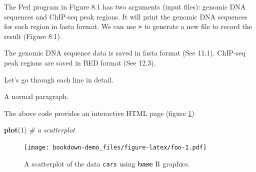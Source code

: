 \documentclass[]{book}
\newenvironment{Shaded}{\begin{snugshade}}{\end{snugshade}}
\newcommand{\KeywordTok}[1]{\textcolor[rgb]{0.13,0.29,0.53}{\textbf{{#1}}}}
\newcommand{\DecValTok}[1]{\textcolor[rgb]{0.00,0.00,0.81}{{#1}}}
\newcommand{\CommentTok}[1]{\textcolor[rgb]{0.56,0.35,0.01}{\textit{{#1}}}}
\newcommand{\NormalTok}[1]{{#1}}
\begin{document}
The Perl program in Figure 8.1 has two arguments (input files): genomic
DNA sequences and ChIP-seq peak regions. It will print the genomic DNA
sequences for each region in fasta format. We can use
\texttt{\textgreater{}} to generate a new file to record the result
(Figure 8.1).

The genomic DNA sequence data is saved in fasta format (See 11.1).
ChIP-seq peak regions are saved in BED format (See 12.3).

Let's go through each line in detail.

A normal paragraph.

The above code provides an interactive HTML page (figure \ref{fig:foo})




\begin{Shaded}
\begin{Highlighting}[]
\KeywordTok{plot}\NormalTok{(}\DecValTok{1}\NormalTok{)  }\CommentTok{# a scatterplot}
\end{Highlighting}
\end{Shaded}

\begin{figure}[htbp]
\centering
\texttt{[image: bookdown-demo\_files/figure-latex/foo-1.pdf]}
\caption{\label{fig:foo}A scatterplot of the data \texttt{cars} using \textbf{base} R
graphics.}
\end{figure}


\end{document}
